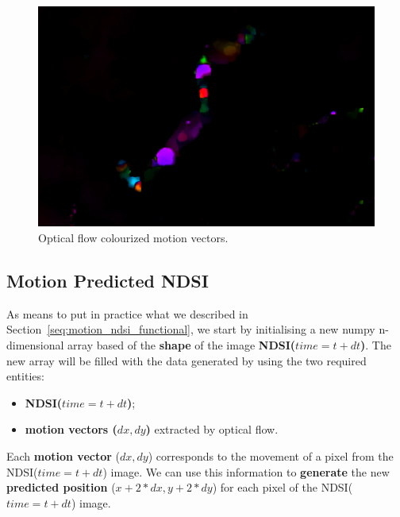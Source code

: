 \documentclass[12pt, a4paper]{report}
\begin{document}
	\begin{figure}[h!]
		\includegraphics[width=\linewidth]{../images/LC81940282013341LGN01_Motion Vectros_color_small.png}
		\caption{Optical flow colourized motion vectors.}
		\label{fig:NDSI}
	\end{figure}
	

	\subsection{Motion Predicted NDSI}
	\label{seq:motion_ndsi_implementation}
	
	\par As means to put in practice what we described in Section~\ref{seq:motion_ndsi_functional}, we start by initialising a new numpy n-dimensional array based of the \textbf{shape} of the image \textbf{NDSI(\(time=t+dt\))}. The new array will be filled with the data generated by using the two required entities:
	
	\begin{itemize}
		\item \textbf{NDSI(\(time=t+dt\))};
		\item \textbf{motion vectors (\(dx, dy\))} extracted by optical flow.
	\end{itemize}
	
	\par Each \textbf{motion vector} (\(dx, dy\)) corresponds to the movement of a pixel from the NDSI(\(time=t+dt\)) image. We can use this information to \textbf{generate} the new \textbf{predicted position} (\(x + 2*dx, y + 2*dy\)) for each pixel of the NDSI(\(time=t+dt\)) image.
	
\end{document}
